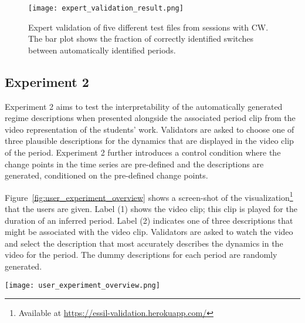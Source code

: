 \begin{figure}
\centering
\texttt{[image: expert\_validation\_result.png]}
\caption{Expert validation of five different test files from sessions with CW. The bar plot shows the fraction of correctly identified switches between automatically identified periods.}
\label{fig:results_expert_validation}
\end{figure}

\subsection{Experiment 2}\label{sec:experiment2-empirical-validation}

Experiment 2 aims to test the interpretability of the automatically generated regime descriptions when presented alongside the associated period clip from the video representation of the students' work. Validators are asked to choose one of three plausible descriptions for the dynamics that are displayed in the video clip of the period. Experiment 2 further introduces a control condition where the change points in the time series are pre-defined and the descriptions are generated, conditioned on the pre-defined change points.

Figure~\ref{fig:user_experiment_overview} shows a screen-shot of the visualization\footnote{Available at \url{https://essil-validation.herokuapp.com/}} that the users are given. Label (1) shows the video clip; this clip is played for the duration of an inferred period. Label (2) indicates one of three descriptions that might be associated with the video clip. Validators are asked to watch the video and select the description that most accurately describes the dynamics in the video for the period. The dummy descriptions for each period are randomly generated.

\begin{sidewaysfigure}
\texttt{[image: user\_experiment\_overview.png]}
\caption{Screen-shot of the user interface designed to evaluate the interpretability of Algorithm~\ref{alg:constrained_alg}. The video representation at (1) is played for the duration of the period. Three plausible descriptions (of which (2) is one of these) are presented and the validator is asked to select the description that best describes the dynamics shown in the video. In this case, \textit{Description 3} is the correct solution.}
\label{fig:user_experiment_overview}
\end{sidewaysfigure}

